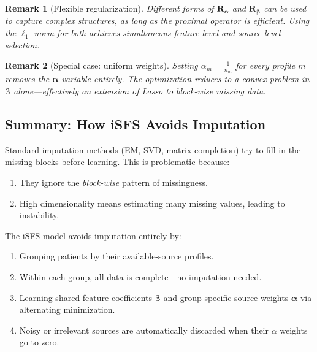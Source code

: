 \documentclass[11pt,a4paper]{article}
\newtheorem{remark}{Remark}
\begin{document}
\begin{remark}[Flexible regularization]
Different forms of $\mathbf{R}_{\boldsymbol{\alpha}}$ and $\mathbf{R}_{\boldsymbol{\beta}}$ can be used to capture complex structures, as long as the proximal operator is efficient. Using the $\ell_1$-norm for both achieves simultaneous feature-level and source-level selection.
\end{remark}

\begin{remark}[Special case: uniform weights]
Setting $\alpha_m = \frac{1}{n_m}$ for every profile $m$ removes the $\boldsymbol{\alpha}$ variable entirely. The optimization reduces to a convex problem in $\boldsymbol{\beta}$ alone---effectively an extension of Lasso to block-wise missing data.
\end{remark}

\subsection{Summary: How iSFS Avoids Imputation}

Standard imputation methods (EM, SVD, matrix completion) try to fill in the missing blocks before learning. This is problematic because:
\begin{enumerate}
    \item They ignore the \emph{block-wise} pattern of missingness.
    \item High dimensionality means estimating many missing values, leading to instability.
\end{enumerate}

The iSFS model avoids imputation entirely by:
\begin{enumerate}
    \item Grouping patients by their available-source profiles.
    \item Within each group, all data is complete---no imputation needed.
    \item Learning shared feature coefficients $\boldsymbol{\beta}$ and group-specific source weights $\boldsymbol{\alpha}$ via alternating minimization.
    \item Noisy or irrelevant sources are automatically discarded when their $\alpha$ weights go to zero.
\end{enumerate}



\newpage
\end{document}
